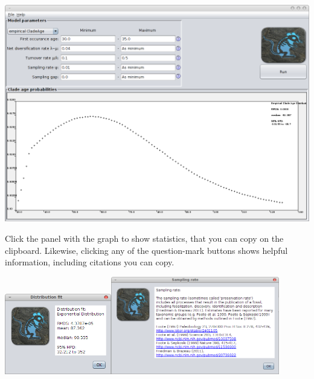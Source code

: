 \documentclass{article}
\begin{document}
\begin{center}\includegraphics[width=\textwidth,clip=true]{ca2.png}\end{center}
Click the panel with the graph to show statistics, that you can copy on the clipboard.
Likewise, clicking any of the question-mark buttons shows helpful information, 
including citations you can copy.
\begin{center}\includegraphics[width=0.35\textwidth]{help.png}\hskip1cm\includegraphics[width=0.55\textwidth]{help2.png}
\end{center}
\end{document}
